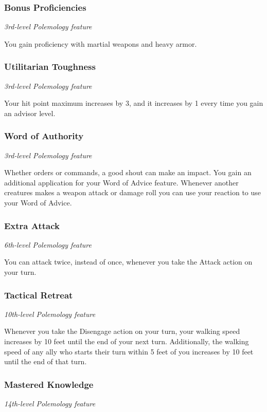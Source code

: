 \documentclass[letterpaper,openany,twoside,twocolumn]{book}
\begin{document}
	\subsubsection*{Bonus Proficiencies}
	\textnormal{\textit{3rd-level Polemology feature}}
	
	You gain proficiency with martial weapons and heavy armor.
	
	\subsubsection*{Utilitarian Toughness}
	\textnormal{\textit{3rd-level Polemology feature}}
	
	Your hit point maximum increases by 3, and it increases by 1 every time you gain an advisor level.
	
	\subsubsection*{Word of Authority}
	\textnormal{\textit{3rd-level Polemology feature}}
	
	Whether orders or commands, a good shout can make an impact. You gain an additional application for your Word of Advice feature. Whenever another creatures makes a weapon attack or damage roll you can use your reaction to use your Word of Advice.
	
	\subsubsection*{Extra Attack}
	\textnormal{\textit{6th-level Polemology feature}}
	
	You can attack twice, instead of once, whenever you take the Attack action on your turn.
	
	\subsubsection*{Tactical Retreat}
	\textnormal{\textit{10th-level Polemology feature}}
	
	Whenever you take the Disengage action on your turn, your walking speed increases by 10 feet until the end of your next turn. Additionally, the walking speed of any ally who starts their turn within 5 feet of you increases by 10 feet until the end of that turn.
	
	\subsubsection*{Mastered Knowledge}
	\textnormal{\textit{14th-level Polemology feature}}
	
\end{document}
